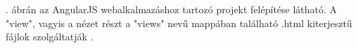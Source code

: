 
. ábrán az AngularJS webalkalmazáshoz tartozó projekt felépítése látható. A "view", vagyis a nézet részt a "views" nevű mappában található .html kiterjesztű fájlok szolgáltatják \cite{AngularJS könyv}.

